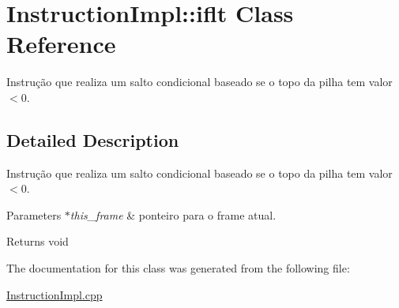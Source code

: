 \hypertarget{class_instruction_impl_1_1iflt}{}\section{Instruction\+Impl\+:\+:iflt Class Reference}
\label{class_instruction_impl_1_1iflt}


Instrução que realiza um salto condicional baseado se o topo da pilha tem valor $<$0.  




\subsection{Detailed Description}
Instrução que realiza um salto condicional baseado se o topo da pilha tem valor $<$0. 


\begin{DoxyParams}{Parameters}
{\em $\ast$this\+\_\+frame} & ponteiro para o frame atual. \\
\hline
\end{DoxyParams}
\begin{DoxyReturn}{Returns}
void 
\end{DoxyReturn}


The documentation for this class was generated from the following file\+:\begin{DoxyCompactItemize}
\item 
\hyperlink{_instruction_impl_8cpp}{Instruction\+Impl.\+cpp}\end{DoxyCompactItemize}
